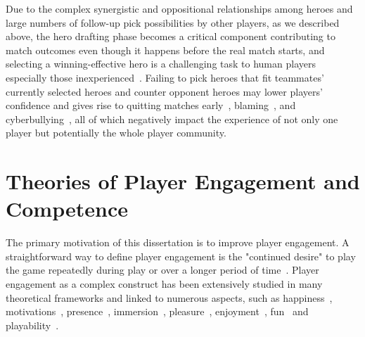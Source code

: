 Due to the complex synergistic and oppositional relationships among heroes and large numbers of follow-up pick possibilities by other players, as we described above, the hero drafting phase becomes a critical component contributing to match outcomes even though it happens before the real match starts, and selecting a winning-effective hero is a challenging task to human players especially those inexperienced~\cite{johnson2015all}. Failing to pick heroes that fit teammates' currently selected heroes and counter opponent heroes may lower players' confidence and gives rise to quitting matches early~\cite{shores2014identification}, blaming~\cite{kou2013regulating}, and  cyberbullying~\cite{kwak2015exploring}, all of which negatively impact the experience of not only one player but potentially the whole player community.



\section{Theories of Player Engagement and Competence}

The primary motivation of this dissertation is to improve player engagement. A straightforward way to define player engagement is the "continued desire" to play the game repeatedly during play or over a longer period of time~\cite{schoenau2011player}. Player engagement as a complex construct has been extensively studied in many theoretical frameworks and linked to numerous aspects, such as happiness~\cite{sweetser2005gameflow,flow1990psychology,chen2007flow}, motivations~\cite{przybylski2010motivational,ryan2006motivational,yee2006demographics,yee2006motivations,sherry2006video}, presence~\cite{lombard1997heart,tamborini2006role}, immersion~\cite{mcmahan2003immersion,brown2004grounded,jennett2008measuring,ermi2005fundamental}, pleasure~\cite{costello2009tool}, enjoyment~\cite{ravaja2007fun,klimmt2003dimensions,mekler2014systematic}, fun~\cite{koster2013theory} and playability~\cite{federoff2003improving,federoff2002heuristics,desurvire2004using,nacke2009playability}.

